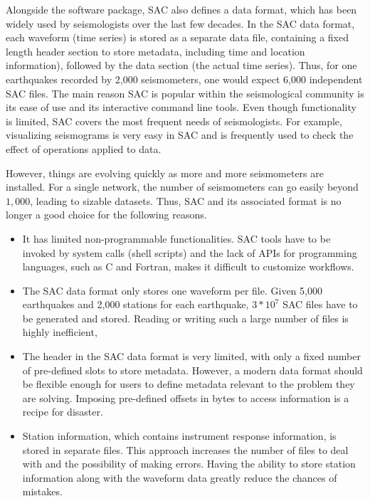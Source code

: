 Alongside the software package, SAC also defines a data format, which has been
widely used by seismologists over the last few decades. In the SAC data format,
each waveform (time series) is stored as a separate data file, containing a
fixed length header section to store metadata, including time and location
information), followed by the data section (the actual time series). Thus, for
one earthquakes recorded by 2,000 seismometers, one would expect 6,000 independent
SAC files. The main reason SAC is popular within the seismological
community is its ease of use and its interactive command line tools. Even though
functionality is limited, SAC covers the most frequent needs of
seismologists. For example, visualizing seismograms is very easy in SAC and is
frequently used to check the effect of operations applied to data.

However, things are evolving quickly as more and more seismometers are
installed. For a single network, the number of seismometers can go easily beyond
$1,000$, leading to sizable datasets. Thus, SAC and its associated format is
no longer a good choice for the following reasons.
\begin{itemize}
    \item It has limited non-programmable functionalities.
      SAC tools have to be invoked by system calls (shell scripts) and the lack of APIs for programming
      languages, such as C and Fortran, makes it difficult to customize workflows.
    \item The SAC data format only stores one waveform per file.
      Given 5,000 earthquakes and 2,000 stations for each earthquake,
      $3*10^7$ SAC files have to be generated and stored. Reading or
      writing such a large number of files is highly inefficient,
    \item The header in the SAC data format is very limited, with only
      a fixed number of pre-defined slots to store metadata. However, a modern
       data format should be flexible enough for users to define metadata relevant to
       the problem they are solving. Imposing pre-defined offsets in bytes
       to access information is a recipe for disaster.
    \item Station information, which contains instrument response information,
    is stored in separate files. This approach increases the number of files to deal
    with and the possibility of making errors.
    Having the ability to store station information along with the waveform data
    greatly reduce the chances of mistakes.
\end{itemize}

